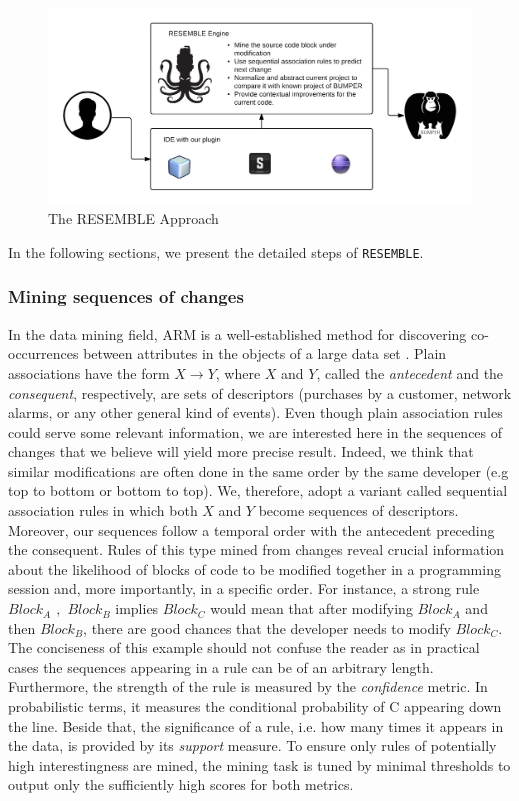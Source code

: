 \begin{figure}[h!]
    \includegraphics[scale=0.9]{media/resemble-approach.png}
    \caption{The RESEMBLE Approach
    \label{fig:RESEMBLE-approach}}
\end{figure}

In the following sections, we present the detailed steps of {\tt RESEMBLE}.

\subsubsection{Mining sequences of changes}

In the data mining field, ARM is a
well-established method for discovering co-occurrences between attributes
in the objects of a large data set \cite{Gregory1991,HEIKKI1997}. Plain
associations have the form $X \rightarrow Y$, where $X$ and $Y$,
called the \textit{antecedent} and the \textit{consequent}, respectively, are sets of descriptors
(purchases by a customer, network alarms, or any other general kind of events).
Even though plain association rules could serve some relevant information, we are interested here in
the sequences of changes that we believe will yield more precise result. Indeed, we think that similar modifications are often done in the same order by the same developer (e.g top to bottom or bottom to top).
We, therefore, adopt a variant called sequential association rules in which
both $X$ and $Y$ become sequences of descriptors.
Moreover, our sequences follow a temporal order with the antecedent preceding the consequent.
Rules of this type mined from changes reveal crucial
information about the likelihood of blocks of code to be modified together in a programming session
and, more importantly, in a specific order.
For instance, a strong rule \emph{$Block_A$ $,$ $Block_B$} implies \emph{$Block_C$} would mean that after modifying $Block_A$ and then $Block_B$, there are good chances that the developer needs to modify $Block_C$.
The conciseness of this example should not confuse the reader as in practical cases
the sequences appearing in a rule can be of an arbitrary length.
Furthermore, the strength of the rule is measured by the \textit{confidence} metric.
In probabilistic terms,
it measures the conditional probability of C appearing down the line.
Beside that, the significance of a rule, i.e. how many times it appears in the data, is provided by its \textit{support} measure.
To ensure only rules of potentially high interestingness are mined,
the mining task is tuned by minimal thresholds to
output only the sufficiently high scores for both metrics.

